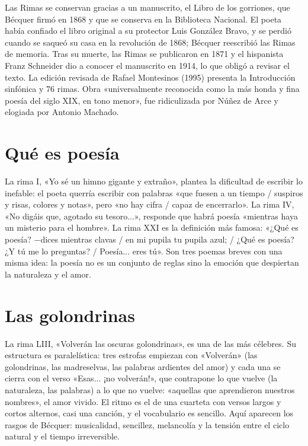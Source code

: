 \documentclass{book}
\begin{document}
Las Rimas se conservan gracias a un manuscrito, el Libro de los gorriones, que Bécquer firmó en 1868 y que se conserva en la Biblioteca Nacional. El poeta había confiado el libro original a su protector Luis González Bravo, y se perdió cuando se saqueó su casa en la revolución de 1868; Bécquer reescribió las Rimas de memoria. Tras su muerte, las Rimas se publicaron en 1871 y el hispanista Franz Schneider dio a conocer el manuscrito en 1914, lo que obligó a revisar el texto. La edición revisada de Rafael Montesinos (1995) presenta la Introducción sinfónica y 76 rimas. Obra «universalmente reconocida como la más honda y fina poesía del siglo XIX, en tono menor», fue ridiculizada por Núñez de Arce y elogiada por Antonio Machado.


\section{Qué es poesía}

La rima I, «Yo sé un himno gigante y extraño», plantea la dificultad de escribir lo inefable: el poeta querría escribir con palabras «que fuesen a un tiempo / suspiros y risas, colores y notas», pero «no hay cifra / capaz de encerrarlo». La rima IV, «No digáis que, agotado su tesoro...», responde que habrá poesía «mientras haya un misterio para el hombre». La rima XXI es la definición más famosa: «¿Qué es poesía? \(-\)dices mientras clavas / en mi pupila tu pupila azul; / ¿Qué es poesía? ¿Y tú me lo preguntas? / Poesía... eres tú». Son tres poemas breves con una misma idea: la poesía no es un conjunto de reglas sino la emoción que despiertan la naturaleza y el amor.


\section{Las golondrinas}

La rima LIII, «Volverán las oscuras golondrinas», es una de las más célebres. Su estructura es paralelística: tres estrofas empiezan con «Volverán» (las golondrinas, las madreselvas, las palabras ardientes del amor) y cada una se cierra con el verso «Esas... ¡no volverán!», que contrapone lo que vuelve (la naturaleza, las palabras) a lo que no vuelve: «aquellas que aprendieron nuestros nombres», el amor vivido. El ritmo es el de una cuarteta con versos largos y cortos alternos, casi una canción, y el vocabulario es sencillo. Aquí aparecen los rasgos de Bécquer: musicalidad, sencillez, melancolía y la tensión entre el ciclo natural y el tiempo irreversible.
\end{document}
